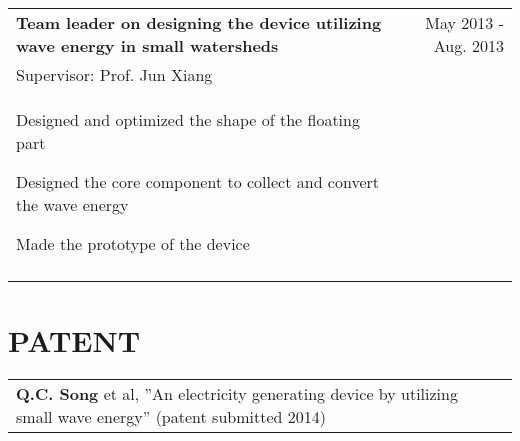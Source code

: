 \documentclass[a4paper,10pt]{article}
\begin{document}
\begin{tabular}{p{14cm}r}
 \large{\textbf{Team leader on designing the device utilizing wave energy in small watersheds}}  &May 2013 - Aug. 2013 \\
\hspace{1em}  Supervisor: Prof. Jun Xiang  & \vspace{-0.5em}\\
\begin{compactitem}
       \item Designed and optimized the shape of the floating part\vspace{0.2em}
       \item Designed the core component to collect and convert the wave energy\vspace{0.2em}
       \item Made the prototype of the device
     \end{compactitem}&\vspace{-1em} \\
\multicolumn{2}{c}{} \vspace{-1.5em} \\


\end{tabular}

\section{PATENT}
\begin{tabular}{p{16cm}l}
\textbf{Q.C. Song} et al, ”An electricity generating device by utilizing small wave energy” (patent submitted 2014) &\\
\end{tabular}
\end{document}
